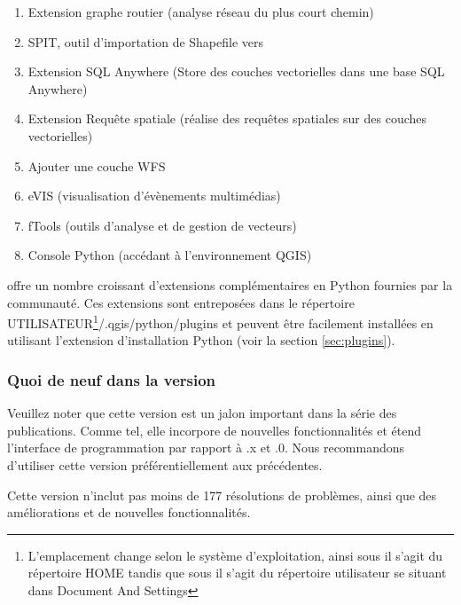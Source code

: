 \begin{enumerate}
\item Extension graphe routier (analyse réseau du plus court chemin)
\item SPIT, outil d'importation de Shapefile vers \ppg
\item Extension SQL Anywhere (Store des couches vectorielles dans une base SQL 
Anywhere)
\item Extension Requête spatiale (réalise des requêtes spatiales sur des couches 
vectorielles)
\item Ajouter une couche WFS 
\item eVIS (visualisation d'évènements multimédias)
\item fTools (outils d'analyse et de gestion de vecteurs)
\item Console Python (accédant à l'environnement QGIS)
\end{enumerate}


\qg offre un nombre croissant d'extensions complémentaires en Python fournies 
par la communauté. Ces extensions sont entreposées dans le répertoire 
UTILISATEUR\footnote{L'emplacement change selon le système d'exploitation, 
ainsi sous \nix{} il s'agit du répertoire HOME tandis que sous \win{} il 
s'agit du répertoire utilisateur se situant dans Document And Settings}/.qgis/python/plugins 
et peuvent être facilement installées en utilisant l'extension d'installation 
Python (voir la section \ref{sec:plugins}). 

\subsubsection{Quoi de neuf dans la version ~\CURRENT} 

Veuillez noter que cette version est un jalon important dans la série des 
publications. Comme tel, elle incorpore de nouvelles fonctionnalités et étend 
l'interface de programmation par rapport à .x et .0. Nous 
recommandons d'utiliser cette version préférentiellement aux précédentes.

Cette version n'inclut pas moins de 177 résolutions de problèmes, ainsi que des 
améliorations et de nouvelles fonctionnalités.



